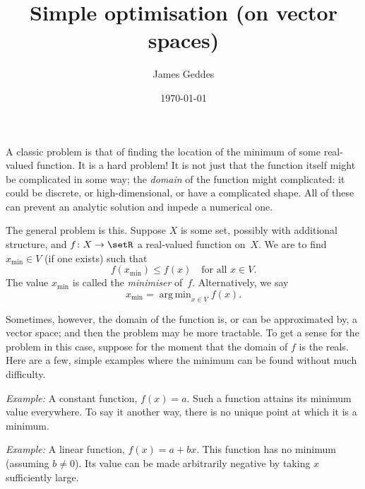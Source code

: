 \documentclass[10pt, a4paper]{article}
\title{Simple optimisation (on vector spaces)}
\author{James Geddes}
\date{\today}
\DeclareMathOperator*{\argmin}{arg\,min}
\newcommand{\eg}{\emph{Example:}}
\begin{document}
\maketitle

A classic problem is that of finding the location of the minimum of
some real-valued function. It is a hard problem! It is not just that
the function itself might be complicated in some way; the
\emph{domain} of the function might complicated: it could be discrete,
or high-dimensional, or have a complicated shape. All of these can
prevent an analytic solution and impede a numerical one.

The general problem is this. Suppose $X$ is some set, possibly with
additional structure, and $f\colon X \to \setR$ a real-valued function
on~$X$. We are to find $x_\text{min}\in V$ (if one exists) such that
\[
 f(x_\text{min}) \leq f(x) \quad\text{for all $x\in V$}.  
\]
The value $x_\text{min}$ is called the \emph{minimiser}
of~$f$. Alternatively, we say
\begin{equation}
  x_\text{min} = \argmin_{x\in V} f(x).
\label{eq:argmin}
\end{equation}

Sometimes, however, the domain of the function is, or can be
approximated by, a vector space; and then the problem may be more
tractable. To get a sense for the problem in this case, suppose for
the moment that the domain of $f$ is the reals. Here are a few, simple
examples where the minimum can be found without much difficulty.

\eg{} A constant function, $f(x) = a$. Such a function attains its
minimum value everywhere. To say it another way, there is no unique
point at which it is a minimum.

\eg{} A linear function, $f(x) = a + bx$. This
function has no minimum (assuming $b\neq0$). Its value can be made
arbitrarily negative by taking $x$ sufficiently large.
\end{document}
